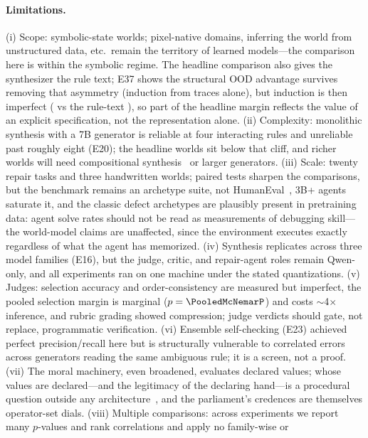 \documentclass[11pt]{article}
\begin{document}
\paragraph{Limitations.} (i) Scope: symbolic-state worlds; pixel-native
domains, inferring the world from unstructured data, etc.\ remain the territory
of learned models---the comparison here is within the symbolic regime. The headline comparison also gives the
synthesizer the rule text; E37 shows the structural OOD advantage survives
removing that asymmetry (induction from traces alone), but induction is then
imperfect (\IndTracesIn{} vs the rule-text \IndRulesIn), so part of the
headline margin reflects the value of an explicit specification, not the
representation alone. (ii) Complexity: monolithic synthesis with a
7B generator is reliable at four interacting rules and unreliable past
roughly eight (E20); the headline worlds sit below that cliff, and richer
worlds will need compositional synthesis~\cite{poeworld2025} or larger
generators. (iii) Scale: twenty repair tasks and three handwritten worlds;
paired tests sharpen the comparisons, but the benchmark remains an archetype
suite, not HumanEval~\cite{humaneval2021}, 3B+ agents saturate it, and the
classic defect archetypes are plausibly present in pretraining data: agent
solve rates should not be read as measurements of debugging skill---the
world-model claims are unaffected, since the environment executes exactly
regardless of what the agent has memorized. (iv) Synthesis replicates across
three model families (E16), but the judge, critic, and repair-agent roles
remain Qwen-only, and all experiments ran on one machine under the stated
quantizations. (v) Judges: selection accuracy and order-consistency are
measured but imperfect, the pooled selection margin is marginal
($p=\PooledMcNemarP$) and costs $\sim$4$\times$ inference, and rubric grading
showed compression; judge verdicts should gate, not replace, programmatic
verification. (vi) Ensemble self-checking (E23) achieved perfect
precision/recall here but is structurally vulnerable to correlated errors
across generators reading the same ambiguous rule; it is a screen, not a
proof. (vii) The moral machinery, even broadened, evaluates declared values; whose
values are declared---and the legitimacy of the declaring hand---is a
procedural question outside any architecture~\cite{scanlon1998}, and the
parliament's credences are themselves operator-set dials.
(viii) Multiple comparisons: across \NumExperiments{} experiments we report many
$p$-values and rank correlations and apply no family-wise or
\end{document}
